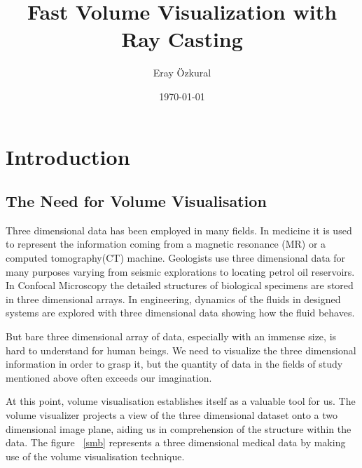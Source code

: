 \documentclass[a4paper,12pt]{article}
\title{Fast Volume Visualization with Ray Casting}
\author{Eray \"Ozkural}
\date{\today}
\begin{document}
\maketitle

\newpage

\section{Introduction}

\subsection{The Need for Volume Visualisation}

Three dimensional data has been employed in many fields. In medicine
it is used to represent the information coming from a magnetic
resonance (MR) or a computed tomography(CT) machine. Geologists use
three dimensional data for many purposes varying from seismic
explorations to locating petrol oil reservoirs. In Confocal Microscopy
the detailed structures of biological specimens are stored in three
dimensional arrays. In engineering, dynamics of the fluids in designed
systems are explored with three dimensional data showing how the fluid
behaves.
 
But bare three dimensional array of data, especially with an immense
size, is hard to understand for human beings.  We need to visualize
the three dimensional information in order to grasp it, but the
quantity of data in the fields of study mentioned above often exceeds
our imagination.

At this point, volume visualisation establishes itself as a valuable
tool for us. The volume visualizer projects a view of the three
dimensional dataset onto a two dimensional image plane, aiding us in
comprehension of the structure within the data. The figure ~\ref{smb}
represents a three dimensional medical data by making use of the
volume visualisation technique.
\end{document}
